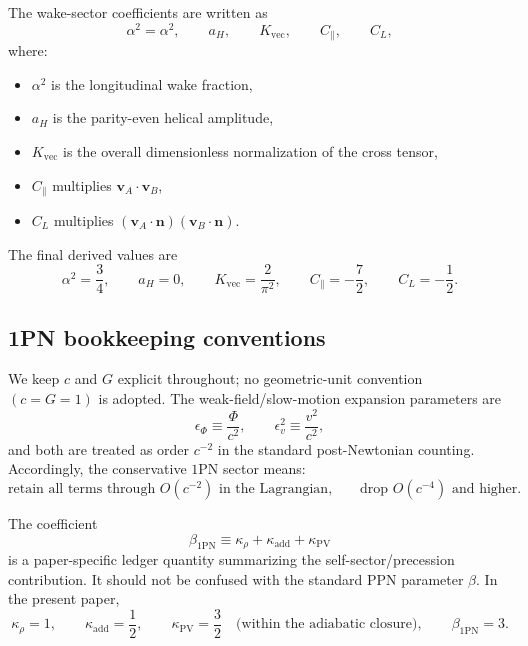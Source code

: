 \documentclass[11pt]{article}
\newcommand{\vct}{\mathbf v}
\newcommand{\nvec}{\mathbf n}
\newcommand{\kadd}{\kappa_{\mathrm{add}}}
\newcommand{\kPV}{\kappa_{\mathrm{PV}}}
\newcommand{\krho}{\kappa_{\rho}}
\newcommand{\betaPN}{\beta_{\mathrm{1PN}}}
\newcommand{\Kvec}{K_{\mathrm{vec}}}
\newcommand{\alphaSq}{\alpha^2}
\newcommand{\PhiN}{\Phi}
\newcommand{\Cpara}{C_{\parallel}}
\newcommand{\CLong}{C_{L}}
\begin{document}
The wake-sector coefficients are written as
\begin{equation}
\alphaSq=\alpha^2,
\qquad
a_H,
\qquad
\Kvec,
\qquad
\Cpara,
\qquad
\CLong,
\label{eq:notation-wake-symbols}
\end{equation}
where:
\begin{itemize}[leftmargin=1.5em]
  \item \(\alphaSq\) is the longitudinal wake fraction,
  \item \(a_H\) is the parity-even helical amplitude,
  \item \(\Kvec\) is the overall dimensionless normalization of the cross tensor,
  \item \(\Cpara\) multiplies \(\vct_A\!\cdot\!\vct_B\),
  \item \(\CLong\) multiplies
  \((\vct_A\!\cdot\!\nvec)(\vct_B\!\cdot\!\nvec)\).
\end{itemize}
The final derived values are
\begin{equation}
\alphaSq=\frac34,
\qquad
a_H=0,
\qquad
\Kvec=\frac{2}{\pi^2},
\qquad
\Cpara=-\frac72,
\qquad
\CLong=-\frac12.
\label{eq:notation-wake-final-values}
\end{equation}

\subsection{1PN bookkeeping conventions}
\label{app:notation-pn}

We keep \(c\) and \(G\) explicit throughout; no geometric-unit convention
\((c=G=1)\) is adopted. The weak-field/slow-motion expansion parameters are
\begin{equation}
\epsilon_\Phi \equiv \frac{\PhiN}{c^2},
\qquad
\epsilon_v^2 \equiv \frac{v^2}{c^2},
\label{eq:notation-epsilons}
\end{equation}
and both are treated as order \(c^{-2}\) in the standard post-Newtonian counting.
Accordingly, the conservative \(1\)PN sector means:
\begin{equation}
\text{retain all terms through } O(c^{-2}) \text{ in the Lagrangian,}
\qquad
\text{drop } O(c^{-4}) \text{ and higher.}
\label{eq:notation-pn-counting}
\end{equation}

The coefficient
\begin{equation}
\betaPN \equiv \krho+\kadd+\kPV
\label{eq:notation-betaPN}
\end{equation}
is a paper-specific ledger quantity summarizing the self-sector/precession contribution.
It should not be confused with the standard PPN parameter \(\beta\). In the present paper,
\begin{equation}
\krho=1,
\qquad
\kadd=\frac12,
\qquad
\kPV=\frac32
\quad \text{(within the adiabatic closure)},
\qquad
\betaPN=3.
\label{eq:notation-betaPN-values}
\end{equation}
\end{document}

